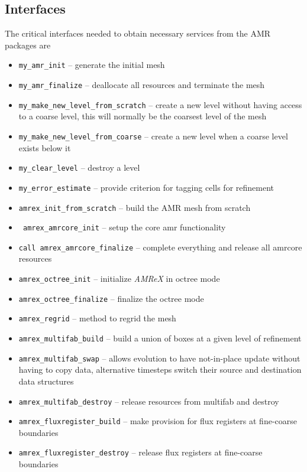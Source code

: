 \documentclass{article}
\newcommand{\code}[1]{{\tt#1}}
\newcommand{\amrex}{{\it AMReX}\xspace}
\begin{document}
\subsection{Interfaces}
\label{sec:amrex-interfaces}
The critical interfaces needed to obtain necessary services from the
AMR packages are
\begin{itemize}
\item \code{my\_amr\_init} -- generate the initial mesh
\item \code{my\_amr\_finalize} -- deallocate all resources and terminate
  the mesh
\item \code{my\_make\_new\_level\_from\_scratch} -- create a new level
  without having access to a coarse level, this will normally be the
  coarsest level of the mesh
\item \code{my\_make\_new\_level\_from\_coarse} -- create a new level when
  a coarse level exists below it
\item \code{my\_clear\_level} -- destroy a level
\item \code{my\_error\_estimate} -- provide criterion for tagging cells
  for refinement
\item \code{amrex\_init\_from\_scratch} -- build the AMR mesh from
  scratch
\item \code{ amrex\_amrcore\_init} -- setup the core amr functionality
\item \code{call amrex\_amrcore\_finalize} -- complete everything and
  release all amrcore resources
\item \code{amrex\_octree\_init} -- initialize \amrex in octree mode
\item \code{amrex\_octree\_finalize} -- finalize the octree mode
\item \code{amrex\_regrid} -- method to regrid the mesh
\item \code{amrex\_multifab\_build} -- build a union of boxes at a given level
of refinement
\item \code{amrex\_multifab\_swap} -- allows evolution to have
  not-in-place update without having to copy data, alternative
  timesteps switch their source and destination data structures
\item \code{amrex\_multifab\_destroy} -- release resources from multifab
  and destroy
\item \code{amrex\_fluxregister\_build} -- make provision for flux
  registers at fine-coarse boundaries
\item \code{amrex\_fluxregister\_destroy} -- release flux 
  registers at fine-coarse boundaries

\end{itemize}
\end{document}
